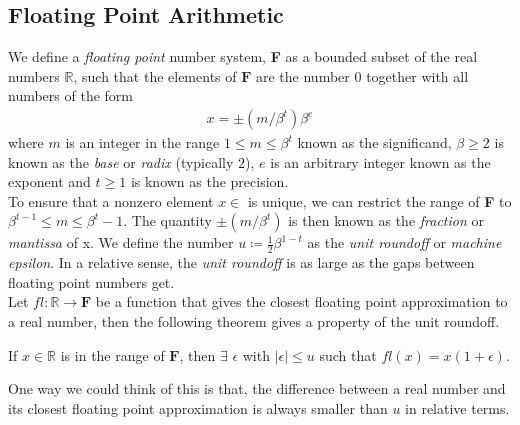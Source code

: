 \subsection{Floating Point Arithmetic}
We define a \textit{floating point} number system, \textbf{F} as a bounded subset of the real numbers $\mathbb{R}$, such that the elements of $\mathbf{F}$ are the number $0$ together with all numbers of the form
\begin{align*}
	x = \pm(m / \beta^t)\beta^e
\end{align*}
where $m$ is an integer in the range $1\leq m\leq \beta^t$ known as the significand, $\beta \geq 2$ is known as the \textit{base} or \textit{radix} (typically $2$), $e$ is an arbitrary integer known as the exponent and $t\geq 1$ is known as the precision.\\
To ensure that a nonzero element $x \in$  is unique, we can restrict the range of \textbf{F} to $\beta^{t-1} \leq m \leq \beta^t - 1$. The quantity $\pm(m/\beta^t)$ is then known as the \textit{fraction} or \textit{mantissa} of x. We define the number $u \coloneq \frac{1}{2}\beta^{1-t}$ as the \textit{unit roundoff} or \textit{machine epsilon}. In a relative sense, the \textit{unit roundoff} is as large as the gaps between floating point numbers get.\\
Let $fl :  \mathbb{R} \rightarrow \mathbf{F}$ be a function that gives the closest floating point approximation to a real number, then the following theorem gives a property of the unit roundoff.
\begin{theorem}
	If $x \in \mathbb{R}$ is in the range of $\mathbf{F}$, then $\exists$ $\epsilon$ with $|\epsilon| \le u$ such that $fl(x) = x(1+\epsilon)$.
\end{theorem}
One way we could think of this is that, the difference between a real number and its closest floating point approximation is always smaller than $u$ in relative terms.
